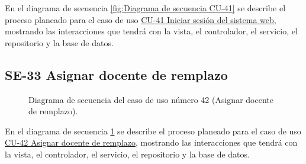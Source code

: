 En el diagrama de secuencia \ref{fig:Diagrama de secuencia CU-41} se describe el proceso planeado para el caso de uso \hyperlink{CU-41}{CU-41 Iniciar sesión del sistema web}, mostrando las interacciones que tendrá con la vista, el controlador, el servicio, el repositorio y la base de datos.

\newpage

\subsection{SE-33 Asignar docente de remplazo}

\begin{figure}[htbp!]
	\begin{center}
		\caption{Diagrama de secuencia del caso de uso número 42 (Asignar docente de remplazo).}
		\label{fig:Diagrama de secuencia CU-42}
	\end{center}
\end{figure}

En el diagrama de secuencia \ref{fig:Diagrama de secuencia CU-42} se describe el proceso planeado para el caso de uso \hyperlink{CU-42}{CU-42 Asignar docente de remplazo}, mostrando las interacciones que tendrá con la vista, el controlador, el servicio, el repositorio y la base de datos.